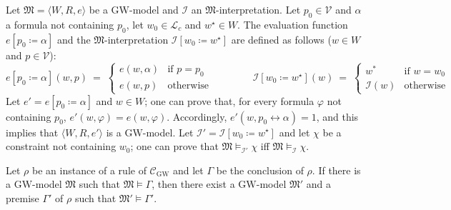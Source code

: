 \documentclass[copyright,creativecommons]{eptcs}
\newcommand{\GWM}{\mbox{$\mathrm{GW}$}}
\newcommand{\Calcw}{\Ccal_{\mathrm{GW}}}
\newcommand{\tto}{\leftrightarrow}
\newcommand{\LC}{\Lcal_c}
\newcommand{\PV}{\Vcal}
\newcommand{\reass}[3]{#1[#2 \coloneqq #3]}
\newcommand{\stru}[1]{\langle #1 \rangle} %
\newcommand{\M}{\mathfrak{M}}
\renewcommand{\a}{\alpha}
\newcommand{\G}{\Gamma}
\newcommand{\Ccal}{\mathcal{C}}
\newcommand{\Ical}{\mathcal{I}}
\newcommand{\Lcal}{\mathcal{L}}
\newcommand{\Vcal}{\mathcal{V}}
\begin{document}
Let $\M=\stru{W,R,e}$ be a $\GWM$-model and  $\Ical$  an $\M$-interpretation.
Let $p_0 \in \PV$ and $\a$  a formula not containing $p_0$, let $w_0\in\LC$  and   $w^\star\in W$.
The evaluation function   $\reass{e}{p_0}{\a}$   and the  $\M$-interpretation  $\reass{\Ical}{w_0}{w^\star}$
are defined as follows ($w\in W$ and $p\in\PV$):
\[
\reass{e}{p_0}{\a}(w,p)\:=\;
  \begin{cases}
  e(w,\a) &\text{if $p=p_0$}  
 \\[0.5ex]
 e(w,p) &\text{otherwise}   
  \end{cases}
\hspace{4em}
  \reass{\Ical}{w_0}{w^\star}(w) \:=\;
  \begin{cases}
  w^* &\text{if $w=w_0$}  
 \\[0.5ex]
 \Ical(w) &\text{otherwise}   
  \end{cases}
\]
Let $e'=\reass{e}{p_0}{\a}$ and $w\in W$; one can prove that, for
every formula $\varphi$ not containing $p_0$,
$e'(w,\varphi)=e(w,\varphi)$. Accordingly, $e'(w,p_0\tto \a)=1$, and
this implies that $\stru{W,R,e'}$ is a $\GWM$-model.  Let
$\Ical'=\reass{\Ical}{w_0}{w^\star}$ and let $\chi$ be a constraint
not containing $w_0$; one can prove that $\M\models_{\Ical'}\chi$ iff
$\M\models_{\Ical}\chi$.




\begin{lemma}\label{lemma:soundRule}
  Let $\rho$ be an instance of a rule of $\Calcw$ and 
 let $\Gamma$  be the conclusion of $\rho$. If there is  a \GWM-model $\M$
 such that $\M\models\G$, then there exist a
\GWM-model $\M'$ and a   premise $\G'$ of $\rho$
  such that $\M'\models\G'$.
\end{lemma}
\end{document}
